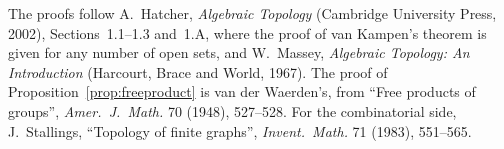 The proofs follow A.~Hatcher, \emph{Algebraic Topology} (Cambridge University Press, 2002), Sections~1.1--1.3 and~1.A, where the proof of van Kampen's theorem is given for any number of open sets,
and W.~Massey, \emph{Algebraic Topology: An Introduction} (Harcourt, Brace and World, 1967). The proof of Proposition~\ref{prop:freeproduct} is van der Waerden's, from ``Free products of groups'',
\emph{Amer.\ J.\ Math.} 70 (1948), 527--528. For the combinatorial side, J.~Stallings, ``Topology of finite graphs'', \emph{Invent.\ Math.} 71 (1983), 551--565.
